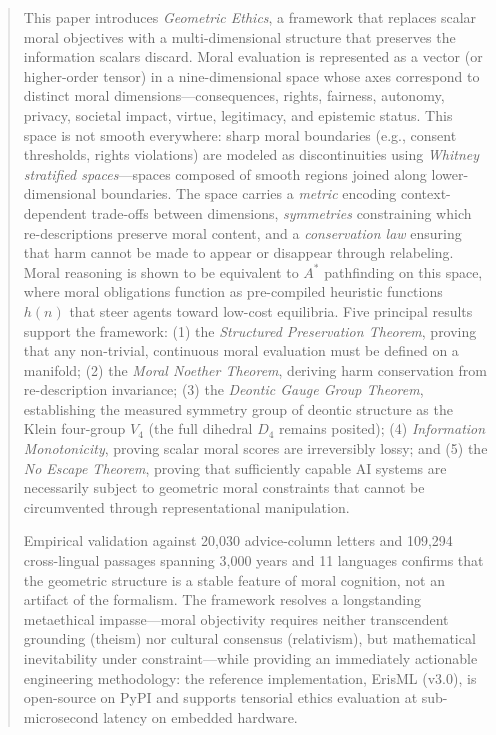 \documentclass[12pt,letterpaper]{article}
\theoremstyle{definition}
\theoremstyle{remark}
\begin{document}
\begin{titlepage}
\begin{abstract}
This paper introduces \emph{Geometric Ethics}, a framework that replaces scalar moral objectives with a multi-dimensional structure that preserves the information scalars discard. Moral evaluation is represented as a vector (or higher-order tensor) in a nine-dimensional space whose axes correspond to distinct moral dimensions---consequences, rights, fairness, autonomy, privacy, societal impact, virtue, legitimacy, and epistemic status. This space is not smooth everywhere: sharp moral boundaries (e.g., consent thresholds, rights violations) are modeled as discontinuities using \emph{Whitney stratified spaces}---spaces composed of smooth regions joined along lower-dimensional boundaries. The space carries a \emph{metric} encoding context-dependent trade-offs between dimensions, \emph{symmetries} constraining which re-descriptions preserve moral content, and a \emph{conservation law} ensuring that harm cannot be made to appear or disappear through relabeling. Moral reasoning is shown to be equivalent to $A^*$ pathfinding on this space, where moral obligations function as pre-compiled heuristic functions $h(n)$ that steer agents toward low-cost equilibria. Five principal results support the framework: (1) the \emph{Structured Preservation Theorem}, proving that any non-trivial, continuous moral evaluation must be defined on a manifold; (2) the \emph{Moral Noether Theorem}, deriving harm conservation from re-description invariance; (3) the \emph{Deontic Gauge Group Theorem}, establishing the measured symmetry group of deontic structure as the Klein four-group $V_4$ (the full dihedral $D_4$ remains posited); (4) \emph{Information Monotonicity}, proving scalar moral scores are irreversibly lossy; and (5) the \emph{No Escape Theorem}, proving that sufficiently capable AI systems are necessarily subject to geometric moral constraints that cannot be circumvented through representational manipulation.

Empirical validation against 20,030 advice-column letters and 109,294 cross-lingual passages spanning 3,000 years and 11 languages confirms that the geometric structure is a stable feature of moral cognition, not an artifact of the formalism. The framework resolves a longstanding metaethical impasse---moral objectivity requires neither transcendent grounding (theism) nor cultural consensus (relativism), but mathematical inevitability under constraint---while providing an immediately actionable engineering methodology: the reference implementation, ErisML (v3.0), is open-source on PyPI and supports tensorial ethics evaluation at sub-microsecond latency on embedded hardware.
\end{abstract}


\end{titlepage}
\end{document}
